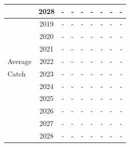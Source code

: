 \documentclass[12pt,]{article}
\begin{document}
\begin{table}[ht]
{\begin{tabular}{l|cc|>{\centering}p{.7in}c|>{\centering}p{.7in}c|>{\centering}p{.7in}c}
   & 2028 & - & - & - & - & - & - & - \\ 
   \hline
 & 2019 & - & - & - & - & - & - & - \\ 
   & 2020 & - & - & - & - & - & - & - \\ 
   & 2021 & - & - & - & - & - & - & - \\ 
  Average & 2022 & - & - & - & - & - & - & - \\ 
  Catch & 2023 & - & - & - & - & - & - & - \\ 
   & 2024 & - & - & - & - & - & - & - \\ 
   & 2025 & - & - & - & - & - & - & - \\ 
   & 2026 & - & - & - & - & - & - & - \\ 
   & 2027 & - & - & - & - & - & - & - \\ 
   & 2028 & - & - & - & - & - & - & - \\ 
   \hline
\end{tabular}
}
\end{table}
\end{document}
